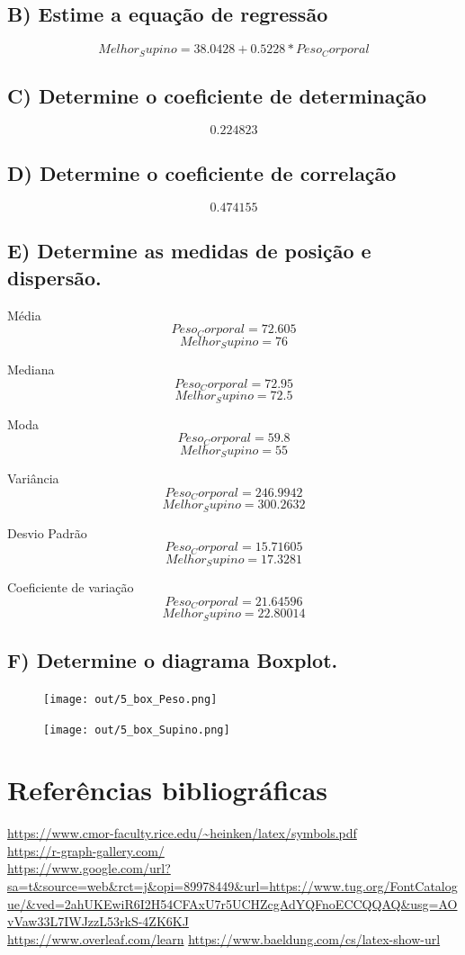 \documentclass[17pt]{extarticle}
\begin{document}
\subsection{B) Estime a equação de regressão}
\[ Melhor_Supino = 38.0428 + 0.5228 * Peso_Corporal \]

\subsection{C) Determine o coeficiente de determinação}
\[ 0.224823 \]

\subsection{D) Determine o coeficiente de correlação}
\[ 0.474155 \]

\subsection{E) Determine as medidas de posição e dispersão.}
Média \\
\[ Peso_Corporal = 72.605 \]
\[ Melhor_Supino = 76 \]

Mediana \\
\[ Peso_Corporal = 72.95 \]
\[ Melhor_Supino = 72.5 \]

Moda \\
\[ Peso_Corporal = 59.8 \]
\[ Melhor_Supino = 55 \]

Variância \\
\[ Peso_Corporal = 246.9942 \]
\[ Melhor_Supino = 300.2632 \]

Desvio Padrão \\
\[ Peso_Corporal = 15.71605 \]
\[ Melhor_Supino = 17.3281 \]

Coeficiente de variação \\
\[ Peso_Corporal = 21.64596 \]
\[ Melhor_Supino = 22.80014 \]

\subsection{F) Determine o diagrama Boxplot.}
\begin{figure}[H]
    \centering
    \texttt{[image: out/5\_box\_Peso.png]}
    \label{fig:my_label}
\end{figure}
\begin{figure}[H]
    \centering
    \texttt{[image: out/5\_box\_Supino.png]}
    \label{fig:my_label}
\end{figure}

\newpage
\section{Referências bibliográficas}
\url{https://www.cmor-faculty.rice.edu/~heinken/latex/symbols.pdf} \\
\url{https://r-graph-gallery.com/} \\
\url{https://www.google.com/url?sa=t&source=web&rct=j&opi=89978449&url=https://www.tug.org/FontCatalogue/&ved=2ahUKEwiR6I2H54CFAxU7r5UCHZcgAdYQFnoECCQQAQ&usg=AOvVaw33L7IWJzzL53rkS-4ZK6KJ} \\
\url{https://www.overleaf.com/learn}
\url{https://www.baeldung.com/cs/latex-show-url}
\end{document}

